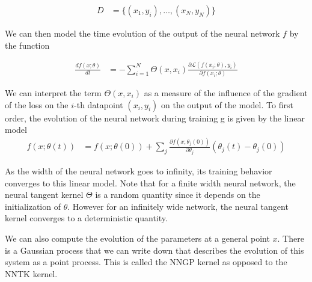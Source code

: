 \documentclass[book.tex]{subfiles}
\begin{document}
\begin{align}
D &= \{(x_1, y_i),\dotsc, (x_N, y_N)\}
\end{align}

We can then model the time evolution of the output of the neural network $f$ by the function

\begin{align}
\frac{df(x; \theta)}{dt} &= - \sum_{i=1}^N \Theta(x, x_i) \frac{\partial \mathcal{L}(f(x_i; \theta), y_i)}{\partial f(x_i; \theta)} 
\end{align}

We can interpret the term $\Theta(x, x_i)$ as a measure of the influence of the gradient of the loss on the $i$-th datapoint $(x_i, y_i)$ on the output of the model. To first order, the evolution of the neural network during training g is given by the linear model
\begin{align}
f(x; \theta(t)) &= f(x; \theta(0)) + \sum_j \frac{\partial f(x; \theta_j(0))}{\partial \theta_j} (\theta_j(t) - \theta_j(0))
\end{align}

As the width of the neural network goes to infinity, its training behavior converges to this linear model. Note that for a finite width neural network, the neural tangent kernel $\Theta$ is a random quantity since it depends on the initialization of $\theta$. However for an infinitely wide network, the neural tangent kernel converges to a deterministic quantity. 




We can also compute the evolution of the parameters at a general point $x$. There is a Gaussian process that we can write down that describes the evolution of this system as a point process. This is called the NNGP kernel as opposed to the NNTK kernel.
\end{document}
